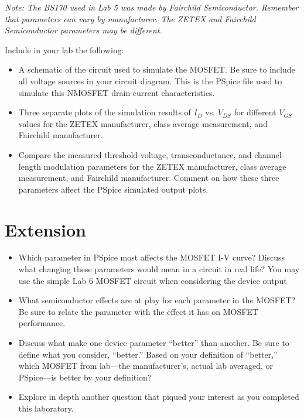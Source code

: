 \documentclass[12pt]{../manual}
\begin{document}
\textit{Note: The BS170 used in Lab 5 was made by Fairchild Semiconductor. Remember that parameters can vary by manufacturer. The ZETEX and Fairchild Semiconductor parameters may be different.}

Include in your lab the following:
\begin{itemize}
\item A schematic of the circuit used to simulate the MOSFET. Be sure to include all voltage sources in your circuit diagram. This is the PSpice file used to simulate this NMOSFET drain-current characteristics.
\item Three separate plots of the simulation results of $I_D$ vs. $V_{DS}$ for different $V_{GS}$ values for the ZETEX manufacturer, class average measurement, and Fairchild manufacturer.
\item Compare the measured threshold voltage, transconductance, and channel-length modulation parameters for the ZETEX manufacturer, class average measurement, and Fairchild manufacturer. Comment on how these three parameters affect the PSpice simulated output plots.
\end{itemize}

\section{Extension}
\begin{itemize}
\item Which parameter in PSpice most affects the MOSFET I-V curve?  Discuss what changing these parameters would mean in a circuit in real life?  You may use the simple Lab 6 MOSFET circuit when considering the device output
\item What semiconductor effects are at play for each parameter in the MOSFET?  Be sure to relate the parameter with the effect it has on MOSFET performance.
\item Discuss what make one device parameter ``better'' than another.  Be sure to define what you consider, ``better.''  Based on your definition of ``better,'' which MOSFET from lab---the manufacturer's, actual lab averaged, or PSpice---is better by your definition?
\item Explore in depth another question that piqued your interest as you completed this laboratory.
\end{itemize}
\end{document}
